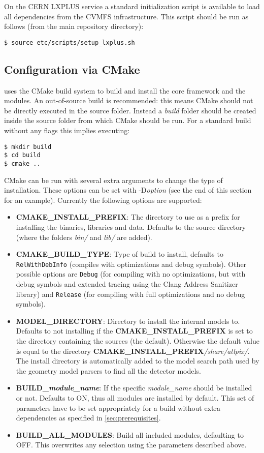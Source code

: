 On the CERN LXPLUS service a standard initialization script is available to load all dependencies from the CVMFS infrastructure. This script should be run as follows (from the main repository directory):
\begin{verbatim}
$ source etc/scripts/setup_lxplus.sh
\end{verbatim}

\subsection{Configuration via CMake}
\label{sec:cmake_config}
\apsq uses the CMake build system to build and install the core framework and the modules. An out-of-source build is recommended: this means CMake should not be directly executed in the source folder. Instead a \textit{build} folder should be created inside the source folder from which CMake should be run. For a standard build without any flags this implies executing:

\begin{verbatim}
$ mkdir build
$ cd build
$ cmake ..
\end{verbatim}

CMake can be run with several extra arguments to change the type of installation. These options can be set with -D\textit{option} (see the end of this section for an example). Currently the following options are supported:
\begin{itemize}
\item \textbf{CMAKE\_INSTALL\_PREFIX}: The directory to use as a prefix for installing the binaries, libraries and data. Defaults to the source directory (where the folders \textit{bin/} and \textit{lib/} are added). 
\item \textbf{CMAKE\_BUILD\_TYPE}: Type of build to install, defaults to \texttt{RelWithDebInfo} (compiles with optimizations and debug symbols). Other possible options are \texttt{Debug} (for compiling with no optimizations, but with debug symbols and extended tracing using the Clang Address Sanitizer library) and \texttt{Release} (for compiling with full optimizations and no debug symbols). 
\item \textbf{MODEL\_DIRECTORY}: Directory to install the internal models to. Defaults to not installing if the \textbf{CMAKE\_INSTALL\_PREFIX} is set to the directory containing the sources (the default). Otherwise the default value is equal to the directory \textbf{CMAKE\_INSTALL\_PREFIX}\-\textit{/share/allpix/}. The install directory is automatically added to the model search path used by the geometry model parsers to find all the detector models.
\item \textbf{BUILD\_\textit{module\_name}}: If the specific \textit{module\_name} should be installed or not. Defaults to ON, thus all modules are installed by default. This set of parameters have to be set appropriately for a build without extra dependencies as specified in \ref{sec:prerequisites}.
\item \textbf{BUILD\_ALL\_MODULES}: Build all included modules, defaulting to OFF. This overwrites any selection using the parameters described above.
\end{itemize}

